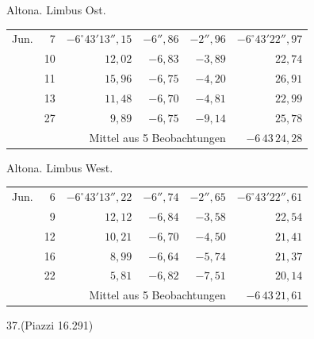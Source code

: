 \noindent\begin{minipage}[t]{.495\textwidth}\centering Altona. Limbus Ost.\par\smallskip
{\scriptsize\setlength{\tabcolsep}{1pt}\renewcommand{\arraystretch}{1.2}\begin{tabular}{lr|r|r|r|r|}
Jun.&7&$-6^\circ43'13''{,}15$&$-6''{,}86$&$-2''{,}96$&$-6^\circ43'22''{,}97$\\
&10&$12{,}02$&$-6{,}83$&$-3{,}89$&$22{,}74$\\
&11&$15{,}96$&$-6{,}75$&$-4{,}20$&$26{,}91$\\
&13&$11{,}48$&$-6{,}70$&$-4{,}81$&$22{,}99$\\
&27&$9{,}89$&$-6{,}75$&$-9{,}14$&$25{,}78$\\
\cline{6-6}\multicolumn{5}{r}{Mittel aus 5 Beobachtungen}&$-6\,43\,24{,}28$
\end{tabular}}\end{minipage}\hfill\begin{minipage}[t]{.495\textwidth}\centering Altona. Limbus West.\par\smallskip
{\scriptsize\setlength{\tabcolsep}{1pt}\renewcommand{\arraystretch}{1.2}\begin{tabular}{lr|r|r|r|r}
Jun.&6&$-6^\circ43'13''{,}22$&$-6''{,}74$&$-2''{,}65$&$-6^\circ43'22''{,}61$\\
&9&$12{,}12$&$-6{,}84$&$-3{,}58$&$22{,}54$\\
&12&$10{,}21$&$-6{,}70$&$-4{,}50$&$21{,}41$\\
&16&$8{,}99$&$-6{,}64$&$-5{,}74$&$21{,}37$\\
&22&$5{,}81$&$-6{,}82$&$-7{,}51$&$20{,}14$\\
\cline{6-6}\multicolumn{5}{r}{Mittel aus 5 Beobachtungen}&$-6\,43\,21{,}61$
\end{tabular}}\end{minipage}
\par\vspace{4mm}
\begin{center}37.\quad (Piazzi 16.291)\end{center}

